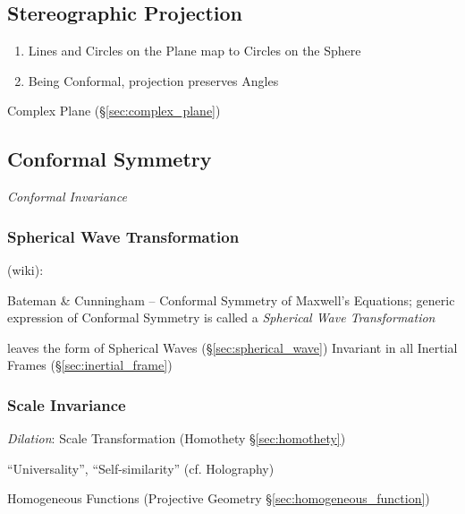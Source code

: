 \subsection{Stereographic Projection}\label{sec:stereographic_projection}

\begin{enumerate}
  \item Lines and Circles on the Plane map to Circles on the Sphere
  \item Being Conformal, projection preserves Angles
\end{enumerate}

Complex Plane (\S\ref{sec:complex_plane})



\subsection{Conformal Symmetry}\label{sec:conformal_symmetry}

\emph{Conformal Invariance}



\subsubsection{Spherical Wave Transformation}
\label{sec:spherical_wave_transformation}

(wiki):

Bateman \& Cunningham -- Conformal Symmetry of Maxwell's Equations; generic
expression of Conformal Symmetry is called a \emph{Spherical Wave
  Transformation}

leaves the form of Spherical Waves (\S\ref{sec:spherical_wave}) Invariant in
all Inertial Frames (\S\ref{sec:inertial_frame})



\subsubsection{Scale Invariance}\label{sec:scale_invariance}

\emph{Dilation}: Scale Transformation (Homothety \S\ref{sec:homothety})

``Universality'', ``Self-similarity'' (cf. Holography)

\fist Homogeneous Functions (Projective Geometry
\S\ref{sec:homogeneous_function})

